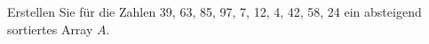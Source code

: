 %
%
Erstellen Sie für die Zahlen 39, 63, 85, 97, 7, 12, 4, 42, 58, 24 ein absteigend sortiertes Array $A$.
\fillwithgrid	{1in}
